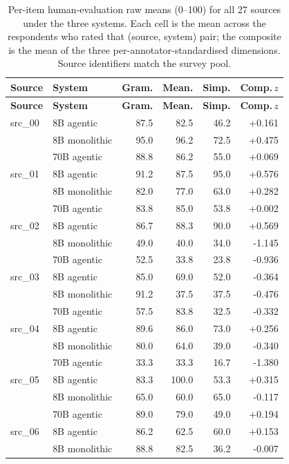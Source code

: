 \begin{longtable}{llrrrr}
\caption{Per-item human-evaluation raw means (0--100) for all 27 sources under the three systems. Each cell is the mean across the respondents who rated that (source, system) pair; the composite is the mean of the three per-annotator-standardised dimensions. Source identifiers match the survey pool.}\label{tab:appendix-item-scores}\\
\hline
\textbf{Source} & \textbf{System} & \textbf{Gram.} & \textbf{Mean.} & \textbf{Simp.} & \textbf{Comp.\,$z$} \\
\hline
\endfirsthead
\hline
\textbf{Source} & \textbf{System} & \textbf{Gram.} & \textbf{Mean.} & \textbf{Simp.} & \textbf{Comp.\,$z$} \\
\hline
\endhead
\hline
\endfoot
src\_00 & 8B agentic & 87.5 & 82.5 & 46.2 & +0.161 \\
 & 8B monolithic & 95.0 & 96.2 & 72.5 & +0.475 \\
 & 70B agentic & 88.8 & 86.2 & 55.0 & +0.069 \\
src\_01 & 8B agentic & 91.2 & 87.5 & 95.0 & +0.576 \\
 & 8B monolithic & 82.0 & 77.0 & 63.0 & +0.282 \\
 & 70B agentic & 83.8 & 85.0 & 53.8 & +0.002 \\
src\_02 & 8B agentic & 86.7 & 88.3 & 90.0 & +0.569 \\
 & 8B monolithic & 49.0 & 40.0 & 34.0 & -1.145 \\
 & 70B agentic & 52.5 & 33.8 & 23.8 & -0.936 \\
src\_03 & 8B agentic & 85.0 & 69.0 & 52.0 & -0.364 \\
 & 8B monolithic & 91.2 & 37.5 & 37.5 & -0.476 \\
 & 70B agentic & 57.5 & 83.8 & 32.5 & -0.332 \\
src\_04 & 8B agentic & 89.6 & 86.0 & 73.0 & +0.256 \\
 & 8B monolithic & 80.0 & 64.0 & 39.0 & -0.340 \\
 & 70B agentic & 33.3 & 33.3 & 16.7 & -1.380 \\
src\_05 & 8B agentic & 83.3 & 100.0 & 53.3 & +0.315 \\
 & 8B monolithic & 65.0 & 60.0 & 65.0 & -0.117 \\
 & 70B agentic & 89.0 & 79.0 & 49.0 & +0.194 \\
src\_06 & 8B agentic & 86.2 & 62.5 & 60.0 & +0.153 \\
 & 8B monolithic & 88.8 & 82.5 & 36.2 & -0.007 \\

\end{longtable}
